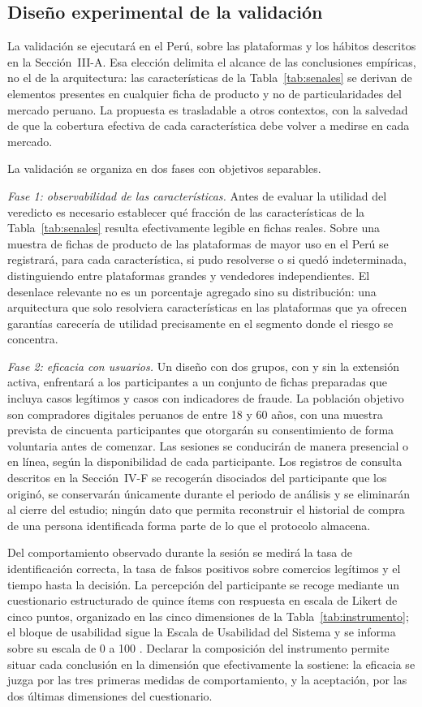 \subsection{Diseño experimental de la validación}

La validación se ejecutará en el Perú, sobre las plataformas y los hábitos descritos en la
Sección~III-A. Esa elección delimita el alcance de las conclusiones empíricas, no el de la
arquitectura: las características de la Tabla~\ref{tab:senales} se derivan de elementos
presentes en cualquier ficha de producto y no de particularidades del mercado peruano. La
propuesta es trasladable a otros contextos, con la salvedad de que la cobertura efectiva de
cada característica debe volver a medirse en cada mercado.

La validación se organiza en dos fases con objetivos separables.

\emph{Fase 1: observabilidad de las características.} Antes de evaluar la utilidad del veredicto es
necesario establecer qué fracción de las características de la Tabla~\ref{tab:senales} resulta
efectivamente legible en fichas reales. Sobre una muestra de fichas de producto de las
plataformas de mayor uso en el Perú se registrará, para cada característica, si pudo resolverse o si
quedó indeterminada, distinguiendo entre plataformas grandes y vendedores independientes.
El desenlace relevante no es un porcentaje agregado sino su distribución: una arquitectura
que solo resolviera características en las plataformas que ya ofrecen garantías carecería de
utilidad precisamente en el segmento donde el riesgo se concentra.

\emph{Fase 2: eficacia con usuarios.} Un diseño con dos grupos, con y sin la extensión activa,
enfrentará a los participantes a un conjunto de fichas preparadas que incluya casos legítimos y
casos con indicadores de fraude. La población objetivo son compradores digitales peruanos de
entre 18 y 60 años, con una muestra prevista de cincuenta participantes que otorgarán su
consentimiento de forma voluntaria antes de comenzar. Las sesiones se conducirán de manera
presencial o en línea, según la disponibilidad de cada participante. Los registros de consulta
descritos en la Sección~IV-F se recogerán disociados del participante que los originó, se
conservarán únicamente durante el periodo de análisis y se eliminarán al cierre del estudio;
ningún dato que permita reconstruir el historial de compra de una persona identificada forma
parte de lo que el protocolo almacena.

Del comportamiento observado durante la sesión se medirá la tasa de identificación correcta,
la tasa de falsos positivos sobre comercios legítimos y el tiempo hasta la decisión. La
percepción del participante se recoge mediante un cuestionario estructurado de quince ítems
con respuesta en escala de Likert de cinco puntos, organizado en las cinco dimensiones de la
Tabla~\ref{tab:instrumento}; el bloque de usabilidad sigue la Escala de Usabilidad del Sistema
y se informa sobre su escala de 0 a 100 \cite{ref23}. Declarar la composición del instrumento
permite situar cada conclusión en la dimensión que efectivamente la sostiene: la eficacia se
juzga por las tres primeras medidas de comportamiento, y la aceptación, por las dos últimas
dimensiones del cuestionario.

